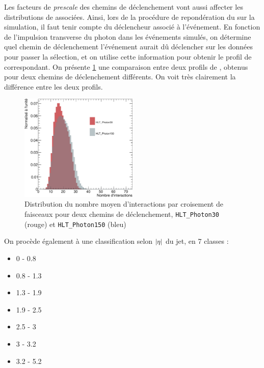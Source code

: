 Les facteurs de \emph{prescale} des chemins de déclenchement vont aussi affecter les distributions de \pu associées. Ainsi, lors de la procédure de repondération du \pu sur la simulation, il faut tenir compte du déclencheur associé à l'événement. En fonction de l'impulsion transverse du photon dans les événements simulés, on détermine quel chemin de déclenchement l'événement aurait dû déclencher sur les données pour passer la sélection, et on utilise cette information pour obtenir le profil de \pu correspondant. On présente \cref{fig:pu_jetmet} une comparaison entre deux profils de \pu, obtenus pour deux chemins de déclenchement différents. On voit très clairement la différence entre les deux profils.

\begin{figure}[tbp]
    \centering
    \includegraphics[width=0.5\textwidth]{chapitre4/figs/pu_plot.pdf}
    \caption{Distribution du nombre moyen d'interactions par croisement de faisceaux pour deux chemins de déclenchement, \texttt{HLT\_Photon30} (rouge) et \texttt{HLT\_Photon150} (bleu)}
    \label{fig:pu_jetmet}
\end{figure}

\bigskip

On procède également à une classification selon $\lvert \eta \rvert$ du jet, en 7 classes :

\begin{multicols}{4}
  \begin{itemize} \setlength{\itemsep}{0.4\itemsep}
      \item \num{0} - \num{0.8}
      \item \num{0.8} - \num{1.3}
      \item \num{1.3} - \num{1.9}
      \item \num{1.9} - \num{2.5}
      \item \num{2.5} - \num{3}
      \item \num{3} - \num{3.2}
      \item \num{3.2} - \num{5.2}
  \end{itemize}
\end{multicols}

